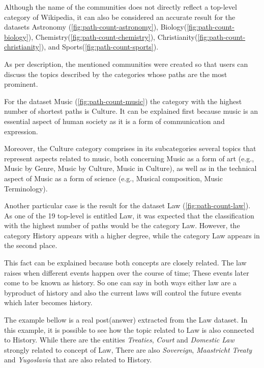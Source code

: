 Although the name of the communities does not directly reflect a top-level category of Wikipedia, it can also be considered an accurate result for the datasets Astronomy (\ref{fig:path-count-astronomy}), Biology(\ref{fig:path-count-biology}), Chemistry(\ref{fig:path-count-chemistry}), Christianity(\ref{fig:path-count-christianity}), and Sports(\ref{fig:path-count-sports}).

As per description, the mentioned communities were created so that users can discuss the topics described by the categories whose paths are the most prominent.

For the dataset Music (\ref{fig:path-count-music}) the category with the highest number of shortest paths is Culture. It can be explained first because music is an essential aspect of human society as it is a form of communication and expression.

Moreover, the Culture category comprises in its subcategories several topics that represent aspects related to music, both concerning Music as a form of art (e.g., Music by Genre, Music by Culture, Music in Culture), as well as in the technical aspect of Music as a form of science (e.g., Musical composition, Music Terminology).

Another particular case is the result for the dataset Law (\ref{fig:path-count-law}). As one of the 19 top-level is entitled Law, it was expected that the classification with the highest number of paths would be the category Law. However, the category History appears with a higher degree, while the category Law appears in the second place.

This fact can be explained because both concepts are closely related. The law raises when different events happen over the course of time; These events later come to be known as history. So one can say in both ways either law are a byproduct of history and also the current laws will control the future events which later becomes history.

The example bellow is a real post(answer) extracted from the Law dataset. In this example, it is possible to see how the topic related to Law is also connected to History. While there are the entities \textit{Treaties}, \textit{Court} and \textit{Domestic Law} strongly related to concept of Law, There are also \textit{Sovereign}, \textit{Maastricht Treaty} and \textit{Yugoslavia} that are also related to History. 

\begin{displayquote}
\end{displayquote}

